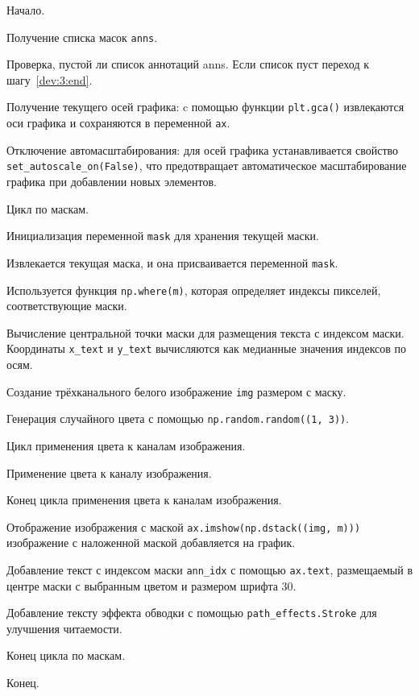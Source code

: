 \begin{enumerate_step}
    \item Начало.
    \item Получение списка масок \lstinline{anns}.
    \item Проверка, пустой ли список аннотаций anns. Если список пуст переход к шагу~\ref{dev:3:end}.
    \item Получение текущего осей графика: c помощью функции \lstinline{plt.gca()} извлекаются оси графика и сохраняются в переменной \lstinline{ax}.
    \item Отключение автомасштабирования: для осей графика устанавливается свойство \lstinline{set_autoscale_on(False)}, что предотвращает автоматическое масштабирование графика при добавлении новых элементов.
    \item Цикл по маскам.
    \item Инициализация переменной \lstinline{mask} для хранения текущей маски.
    \item Извлекается текущая маска, и она присваивается переменной \lstinline{mask}.
    \item Используется функция \lstinline{np.where(m)}, которая определяет индексы пикселей, соответствующие маски.
    \item Вычисление центральной точки маски для размещения текста с индексом маски. Координаты \lstinline{x_text} и \lstinline{y_text} вычисляются как медианные значения индексов по осям.
    \item Создание трёхканального белого изображение \lstinline{img} размером с маску.
    \item Генерация случайного цвета с помощью \lstinline{np.random.random((1, 3))}.
    \item Цикл применения цвета к каналам изображения.
    \item Применение цвета к каналу изображения.
    \item Конец цикла применения цвета к каналам изображения.
    \item Отображение изображения с маской \lstinline{ax.imshow(np.dstack((img, m)))} изображение с наложенной маской добавляется на график.
    \item Добавление текст с индексом маски \lstinline{ann_idx} с помощью \lstinline{ax.text}, размещаемый в центре маски с выбранным цветом и размером шрифта 30.
    \item Добавление тексту эффекта обводки с помощью \lstinline{path_effects.Stroke} для улучшения читаемости.
    \item Конец цикла по маскам.
    \item \label{dev:3:end} Конец.
\end{enumerate_step}

